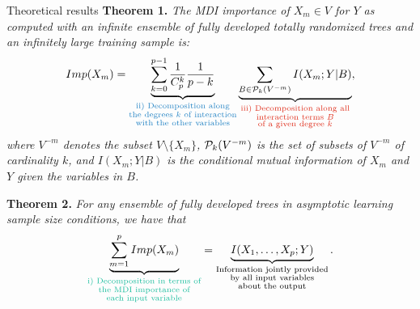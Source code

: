 \documentclass[final]{beamer}
\begin{document}
\begin{frame}{}
\begin{textblock}{0.32}
\begin{block}{Theoretical results \phantom{p}}
\textbf{Theorem 1.}
\textit{The MDI importance of $X_m \in V$ for $Y$ as computed
with an   infinite ensemble of fully developed totally randomized trees and an
infinitely large training sample is:
  \begin{equation*}
  Imp(X_m)=\underbrace{\sum_{k=0}^{p-1} \frac{1}{C_p^k} \frac{1}{p-k}}_{{\color{lightblue} \substack{\text{ii) Decomposition along}\\
                                                                                                     \text{the degrees $k$ of interaction}\\
                                                                                                     \text{with the other variables}}}}
           \underbrace{\sum_{B \in {\cal P}_k(V^{-m})} I(X_m;Y|B)}_{{\color{lightred} \substack{\text{iii) Decomposition along all}\\
                                                                                                \text{interaction terms $B$}\\
                                                                                                \text{of a given degree $k$}}}},
  \end{equation*}
\noindent where $V^{-m}$ denotes the subset $V \setminus \{X_m\}$, ${\cal
P}_k(V^{-m})$ is the set of subsets of  $V^{-m}$ of cardinality $k$, and
$I(X_m;Y|B)$ is the conditional mutual information of $X_{m}$ and $Y$ given the
variables in $B$.}

\vspace{0.3cm}

\textbf{Theorem 2.}
\textit{For any ensemble of fully developed trees in asymptotic learning sample size
conditions, we have that}
\begin{equation*}
\underbrace{\sum_{m=1}^{p}Imp(X_m)}_{{\color{lightgreen} \substack{\text{i) Decomposition in terms of}\\
                                                                   \text{the MDI importance of}\\
                                                                   \text{each input variable}}}} =
\underbrace{I(X_{1}, \ldots, X_{p} ; Y)}_{\substack{\text{Information jointly provided}\\
                                                    \text{by all input variables}\\
                                                    \text{about the output}}}.
\end{equation*}



\end{block}
\end{textblock}
\end{frame}
\end{document}
